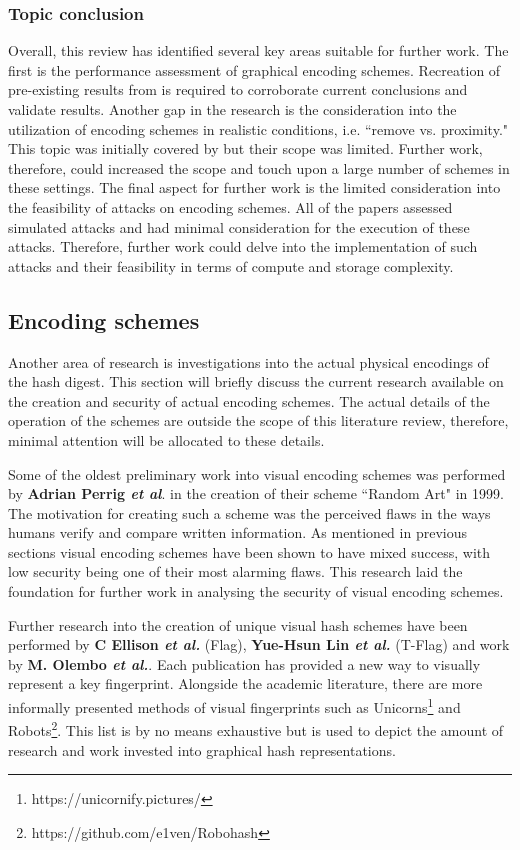 \subsubsection{Topic conclusion}
Overall, this review has identified several key areas suitable for further work.
The first is the performance assessment of graphical encoding schemes. Recreation of pre-existing results from \cite{hsiao2009study}\cite{tan2017can} is required to corroborate current conclusions and validate results.
Another gap in the research is the consideration into the utilization of encoding schemes in realistic conditions, i.e. ``remove vs. proximity." This topic was initially covered by \cite{shirvanian2017pitfalls} but their scope was limited. Further work, therefore, could increased the scope and touch upon a large number of schemes in these settings.
The final aspect for further work is the limited consideration into the feasibility of attacks on encoding schemes. All of the papers assessed simulated attacks and had minimal consideration for the execution of these attacks. Therefore, further work could delve into the implementation of such attacks and their feasibility in terms of compute and storage complexity.

\subsection{Encoding schemes}
Another area of research is investigations into the actual physical encodings of the hash digest. This section will briefly discuss the current research available on the creation and security of actual encoding schemes. The actual details of the operation of the schemes are outside the scope of this literature review, therefore, minimal attention will be allocated to these details.

Some of the oldest preliminary work into visual encoding schemes was performed by \textbf{Adrian Perrig \textit{et al}}\cite{perrig1999hash}. in the creation of their scheme ``Random Art" in 1999. The motivation for creating such a scheme was the perceived flaws in the ways humans verify and compare written information. As mentioned in previous sections visual encoding schemes have been shown to have mixed success, with low security being one of their most alarming flaws. This research laid the foundation for further work in analysing the security of visual encoding schemes.

Further research into the creation of unique visual hash schemes have been performed by \textbf{C Ellison \textit{et al.}} \cite{ellison2003public} (Flag), \textbf{Yue-Hsun Lin \textit{et al.}}\cite{lin2010spate} (T-Flag) and work by \textbf{M.  Olembo \textit{et al.}}\cite{olembo2013developing}. Each publication has provided a new way to visually represent a key fingerprint. Alongside the academic literature, there are more informally presented methods of visual fingerprints such as Unicorns\footnote{https://unicornify.pictures/} and Robots\footnote{https://github.com/e1ven/Robohash}. This list is by no means exhaustive but is used to depict the amount of research and work invested into graphical hash representations.

